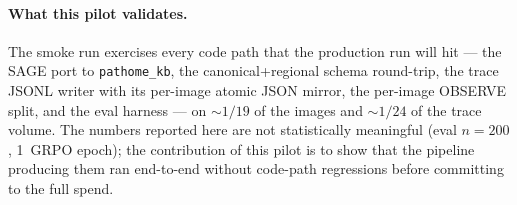 \documentclass[11pt,twocolumn]{article}
\begin{document}
\paragraph{What this pilot validates.} The smoke run
exercises every code path that the production run will hit
--- the SAGE port to \texttt{pathome\_kb}, the
canonical+regional schema round-trip, the trace JSONL writer
with its per-image atomic JSON mirror, the per-image OBSERVE
split, and the eval harness --- on $\sim 1/19$ of the
images and $\sim 1/24$ of the trace volume. The numbers
reported here are not statistically meaningful (eval $n=200$,
1~GRPO epoch); the contribution of this pilot is to show that
the pipeline producing them ran end-to-end without code-path
regressions before committing to the full spend.
\end{document}
